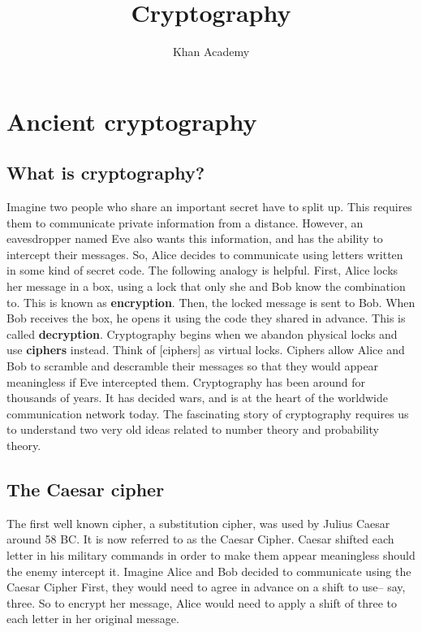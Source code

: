 \documentclass{report}
\title{\Huge{Cryptography}}
\author{\huge{Khan Academy}}
\date{}
\begin{document}
\maketitle
\newpage%
\tableofcontents
\pagebreak

\chapter{Ancient cryptography}
\newpage
\section{What is cryptography?}
Imagine two people who share an important secret have to split up. This requires them to communicate private information from a distance. However, an eavesdropper named Eve also wants this information, and has the ability to intercept their messages. So, Alice decides to communicate using letters written in some kind of secret code. The following analogy is helpful. First, Alice locks her message in a box, using a lock that only she and Bob know the combination to. This is known as \textbf{encryption}. Then, the locked message is sent to Bob. When Bob receives the box, he opens it using the code they shared in advance. This is called \textbf{decryption}. Cryptography begins when we abandon physical locks and use \textbf{ciphers} instead. Think of [ciphers] as virtual locks. Ciphers allow Alice and Bob to scramble and descramble their messages so that they would appear meaningless if Eve intercepted them. Cryptography has been around for thousands of years. It has decided wars, and is at the heart of the worldwide communication network today. The fascinating story of cryptography requires us to understand two very old ideas related to number theory and probability theory.

\section{The Caesar cipher}
The first well known cipher, a substitution cipher, was used by Julius Caesar around 58 BC. It is now referred to as the Caesar Cipher. Caesar shifted each letter in his military commands in order to make them appear meaningless should the enemy intercept it. Imagine Alice and Bob decided to communicate using the Caesar Cipher First, they would need to agree in advance on a shift to use-- say, three. So to encrypt her message, Alice would need to apply a shift of three to each letter in her original message.
\end{document}
